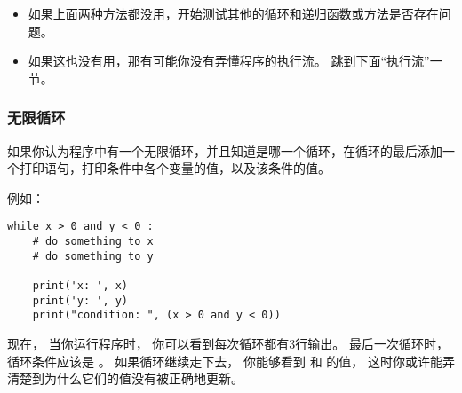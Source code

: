 \begin{itemize}
\item 如果上面两种方法都没用，开始测试其他的循环和递归函数或方法是否存在问题。


\item 如果这也没有用，那有可能你没有弄懂程序的执行流。
跳到下面``执行流''一节。

\end{itemize}

\subsubsection{无限循环}

  
  


如果你认为程序中有一个无限循环，并且知道是哪一个循环，在循环的最后添加一个打印语句，打印条件中各个变量的值，以及该条件的值。


例如：

\begin{lstlisting}
while x > 0 and y < 0 :
    # do something to x
    # do something to y

    print('x: ', x)
    print('y: ', y)
    print("condition: ", (x > 0 and y < 0))
\end{lstlisting}


现在， 当你运行程序时， 你可以看到每次循环都有3行输出。
最后一次循环时， 循环条件应该是 。
如果循环继续走下去， 你能够看到  和  的值， 这时你或许能弄清楚到为什么它们的值没有被正确地更新。

